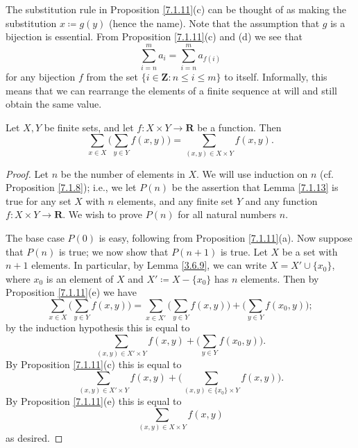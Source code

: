 \begin{remark}\label{7.1.12}
    The substitution rule in Proposition \ref{7.1.11}(c) can be thought of as making the substitution \(x \coloneqq g(y)\) (hence the name).
    Note that the assumption that \(g\) is a bijection is essential.
    From Proposition \ref{7.1.11}(c) and (d) we see that
    \[
        \sum_{i = n}^m a_i = \sum_{i = n}^m a_{f(i)}
    \]
    for any bijection \(f\) from the set \(\{i \in \mathbf{Z} : n \leq i \leq m\}\) to itself.
    Informally, this means that we can rearrange the elements of a finite sequence at will and still obtain the same value.
\end{remark}

\begin{lemma}\label{7.1.13}
    Let \(X, Y\) be finite sets, and let \(f : X \times Y \to \mathbf{R}\) be a function.
    Then
    \[
        \sum_{x \in X} \bigg(\sum_{y \in Y} f(x, y)\bigg) = \sum_{(x, y) \in X \times Y} f(x, y).
    \]
\end{lemma}

\begin{proof}
    Let \(n\) be the number of elements in \(X\).
    We will use induction on \(n\) (cf. Proposition \ref{7.1.8});
    i.e., we let \(P(n)\) be the assertion that Lemma \ref{7.1.13} is true for any set \(X\) with \(n\) elements, and any finite set \(Y\) and any function \(f : X \times Y \to \mathbf{R}\).
    We wish to prove \(P(n)\) for all natural numbers \(n\).

    The base case \(P(0)\) is easy, following from Proposition \ref{7.1.11}(a).
    Now suppose that \(P(n)\) is true;
    we now show that \(P(n + 1)\) is true.
    Let \(X\) be a set with \(n + 1\) elements.
    In particular, by Lemma \ref{3.6.9}, we can write \(X = X' \cup \{x_0\}\), where \(x_0\) is an element of \(X\) and \(X' \coloneqq X - \{x_0\}\) has \(n\) elements.
    Then by Proposition \ref{7.1.11}(e) we have
    \[
        \sum_{x \in X} \bigg(\sum_{y \in Y} f(x, y)\bigg) = \sum_{x \in X'} \bigg(\sum_{y \in Y} f(x, y)\bigg) + \bigg(\sum_{y \in Y} f(x_0, y)\bigg);
    \]
    by the induction hypothesis this is equal to
    \[
        \sum_{(x, y) \in X' \times Y} f(x, y) + \bigg(\sum_{y \in Y} f(x_0, y)\bigg).
    \]
    By Proposition \ref{7.1.11}(c) this is equal to
    \[
        \sum_{(x, y) \in X' \times Y} f(x, y) + \bigg(\sum_{(x, y) \in \{x_0\} \times Y} f(x, y)\bigg).
    \]
    By Proposition \ref{7.1.11}(e) this is equal to
    \[
        \sum_{(x, y) \in X \times Y} f(x, y)
    \]
    as desired.
\end{proof}

